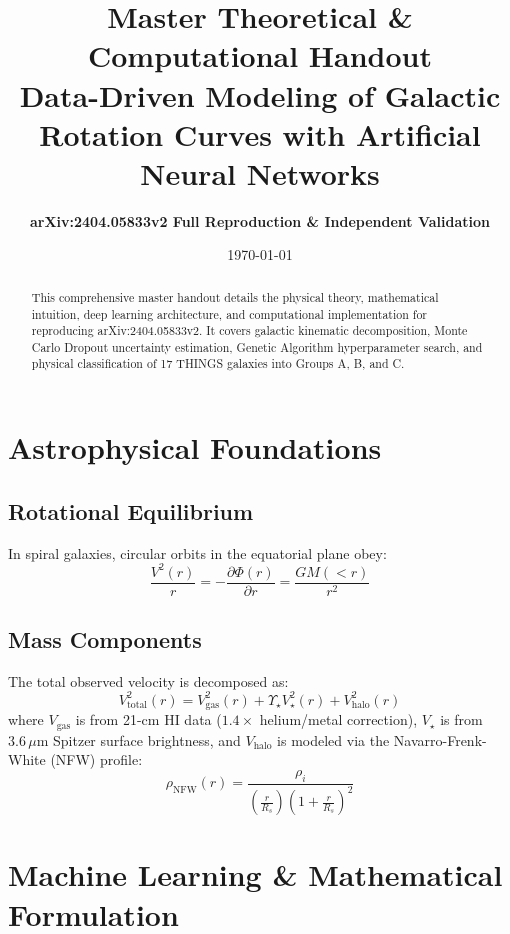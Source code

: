 \documentclass[11pt,a4paper]{article}
\title{\textbf{Master Theoretical \& Computational Handout}\\
\large Data-Driven Modeling of Galactic Rotation Curves with Artificial Neural Networks}
\author{\textbf{arXiv:2404.05833v2 Full Reproduction \& Independent Validation}}
\date{\today}
\begin{document}
\maketitle

\begin{abstract}
This comprehensive master handout details the physical theory, mathematical intuition, deep learning architecture, and computational implementation for reproducing arXiv:2404.05833v2. It covers galactic kinematic decomposition, Monte Carlo Dropout uncertainty estimation, Genetic Algorithm hyperparameter search, and physical classification of 17 THINGS galaxies into Groups A, B, and C.
\end{abstract}

\section{Astrophysical Foundations}

\subsection{Rotational Equilibrium}
In spiral galaxies, circular orbits in the equatorial plane obey:
\begin{equation}
\frac{V^2(r)}{r} = -\frac{\partial \Phi(r)}{\partial r} = \frac{G M(<r)}{r^2}
\end{equation}

\subsection{Mass Components}
The total observed velocity is decomposed as:
\begin{equation}
V_{\text{total}}^2(r) = V_{\text{gas}}^2(r) + \Upsilon_\star V_\star^2(r) + V_{\text{halo}}^2(r)
\end{equation}
where $V_{\text{gas}}$ is from 21-cm HI data ($1.4\times$ helium/metal correction), $V_\star$ is from $3.6\,\mu\text{m}$ Spitzer surface brightness, and $V_{\text{halo}}$ is modeled via the Navarro-Frenk-White (NFW) profile:
\begin{equation}
\rho_{\text{NFW}}(r) = \frac{\rho_i}{\left(\frac{r}{R_s}\right) \left(1 + \frac{r}{R_s}\right)^2}
\end{equation}

\section{Machine Learning \& Mathematical Formulation}
\end{document}
